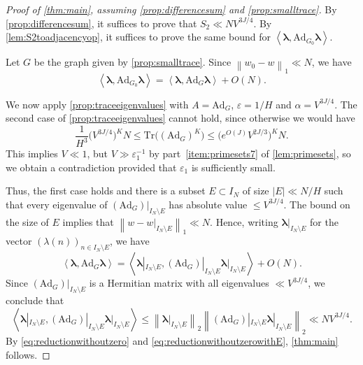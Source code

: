 \documentclass[11pt]{amsart}
\theoremstyle{definition}
\renewcommand{\leq}{\leqslant}
\newcommand{\norm}[1]{\left\|#1\right\|}
\newcommand{\inner}[1]{\left\langle#1\right\rangle}
\newcommand{\eps}{\varepsilon}
\newcommand{\Ad}{\mathrm{Ad}}
\newcommand{\Tr}{\mathrm{Tr}}
\newcommand{\N}{I_N}
\newcommand{\cstH}{\eps_1}
\newcommand{\curlyL}{V}
\newcommand{\curlyLexp}[1]{V^{#1}}
\newcommand{\graph}{G}
\newcommand{\repR}{J}
\newcommand{\repK}{K}
\begin{document}
\begin{proof}[Proof of \cref{thm:main}, assuming \cref{prop:differencesum} and \cref{prop:smalltrace}]
By \cref{prop:differencesum}, it suffices to prove that $S_2 \ll N \curlyLexp{3\repR/4}$. By \cref{lem:S2toadjacencyop}, it suffices to prove the same bound for ${\inner{\boldsymbol{\lambda}, \Ad_{\graph_0}\boldsymbol{\lambda}}}$.

Let $\graph$ be the graph given by \cref{prop:smalltrace}. Since $\norm{w_0-w}_1 \ll N$, we have 
\begin{equation}
\label{eq:reductionwithoutzero}
	\inner{\boldsymbol{\lambda}, \Ad_{\graph_0}\boldsymbol{\lambda}} = \inner{\boldsymbol{\lambda}, \Ad_{\graph} \boldsymbol{\lambda}} + O(N).
\end{equation}

We now apply \cref{prop:traceeigenvalues} with $A = \Ad_{\graph}$, $\eps = 1/H$ and $\alpha = \curlyLexp{3\repR/4}$. The second case of \cref{prop:traceeigenvalues} cannot hold, since otherwise we would have 
\begin{equation*}
\frac{1}{H^3}\big(\curlyLexp{3\repR/4}\big)^{\repK} N \leq \Tr\big((\Ad_{\graph})^{\repK}\big)  \leq \big( e^{O(\repR)} \curlyLexp{2\repR/3}\big)^{\repK} N.
\end{equation*}
This implies $\curlyL \ll 1$, but $\curlyL \gg \cstH^{-1}$ by part~\cref{item:primesets7} of \cref{lem:primesets}, so we obtain a contradiction provided that $\cstH$ is sufficiently small.

Thus, the first case holds and there is a subset $E\subset \N$ of size $|E| \ll N/H$ such that every eigenvalue of $(\Ad_{\graph})|_{\N\setminus E}$ has absolute value $\leq \curlyLexp{3\repR/4}$. The bound on the size of $E$ implies that $\norm{w - w|_{\N\setminus E}}_{1} \ll N$. Hence, writing $\boldsymbol{\lambda}|_{\N\setminus E}$ for the vector $(\lambda(n))_{n\in \N\setminus E}$, we have
\begin{equation}
\label{eq:reductionwithoutzerowithE}
	\inner{\boldsymbol{\lambda}, \Ad_{\graph} \boldsymbol{\lambda}} = \inner{\boldsymbol{\lambda}|_{\N\setminus E}, (\Ad_{\graph})|_{\N\setminus E} \boldsymbol{\lambda}|_{\N\setminus E}} + O(N).
\end{equation}
Since $(\Ad_{\graph})|_{\N\setminus E}$ is a Hermitian matrix with all eigenvalues $\ll \curlyLexp{3\repR/4}$, we conclude that
\begin{equation*}
\inner{\boldsymbol{\lambda}|_{\N\setminus E}, (\Ad_{\graph})|_{\N\setminus E} \boldsymbol{\lambda}|_{\N\setminus E}} \leq \norm{\boldsymbol{\lambda}|_{\N\setminus E}}_2 \norm{(\Ad_{\graph})|_{\N\setminus E} \boldsymbol{\lambda}|_{\N\setminus E}}_2 \ll N\curlyLexp{3\repR/4}.
\end{equation*}
By \cref{eq:reductionwithoutzero} and \cref{eq:reductionwithoutzerowithE}, \cref{thm:main} follows.
\end{proof}
\end{document}
